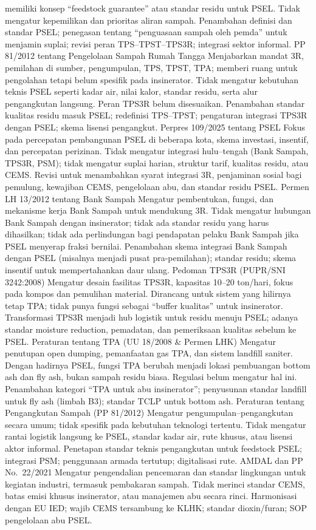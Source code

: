 \documentclass[
  letterpaper,
  DIV=11,
  numbers=noendperiod]{scrreprt}
\begin{document}
memiliki konsep ``feedstock guarantee'' atau standar residu untuk PSEL.
Tidak mengatur kepemilikan dan prioritas aliran sampah. Penambahan
definisi dan standar PSEL; penegasan tentang ``penguasaan sampah oleh
pemda'' untuk menjamin suplai; revisi peran TPS--TPST--TPS3R; integrasi
sektor informal. PP 81/2012 tentang Pengelolaan Sampah Rumah Tangga
Menjabarkan mandat 3R, pemilahan di sumber, pengumpulan, TPS, TPST, TPA;
memberi ruang untuk pengolahan tetapi belum spesifik pada insinerator.
Tidak mengatur kebutuhan teknis PSEL seperti kadar air, nilai kalor,
standar residu, serta alur pengangkutan langsung. Peran TPS3R belum
disesuaikan. Penambahan standar kualitas residu masuk PSEL; redefinisi
TPS--TPST; pengaturan integrasi TPS3R dengan PSEL; skema lisensi
pengangkut. Perpres 109/2025 tentang PSEL Fokus pada percepatan
pembangunan PSEL di beberapa kota, skema investasi, insentif, dan
percepatan perizinan. Tidak mengatur integrasi hulu--tengah (Bank
Sampah, TPS3R, PSM); tidak mengatur suplai harian, struktur tarif,
kualitas residu, atau CEMS. Revisi untuk menambahkan syarat integrasi
3R, penjaminan sosial bagi pemulung, kewajiban CEMS, pengelolaan abu,
dan standar residu PSEL. Permen LH 13/2012 tentang Bank Sampah Mengatur
pembentukan, fungsi, dan mekanisme kerja Bank Sampah untuk mendukung 3R.
Tidak mengatur hubungan Bank Sampah dengan insinerator; tidak ada
standar residu yang harus dihasilkan; tidak ada perlindungan bagi
pendapatan pelaku Bank Sampah jika PSEL menyerap fraksi bernilai.
Penambahan skema integrasi Bank Sampah dengan PSEL (misalnya menjadi
pusat pra-pemilahan); standar residu; skema insentif untuk
mempertahankan daur ulang. Pedoman TPS3R (PUPR/SNI 3242:2008) Mengatur
desain fasilitas TPS3R, kapasitas 10--20 ton/hari, fokus pada kompos dan
pemulihan material. Dirancang untuk sistem yang hilirnya tetap TPA;
tidak punya fungsi sebagai ``buffer kualitas'' untuk insinerator.
Transformasi TPS3R menjadi hub logistik untuk residu menuju PSEL; adanya
standar moisture reduction, pemadatan, dan pemeriksaan kualitas sebelum
ke PSEL. Peraturan tentang TPA (UU 18/2008 \& Permen LHK) Mengatur
penutupan open dumping, pemanfaatan gas TPA, dan sistem landfill
saniter. Dengan hadirnya PSEL, fungsi TPA berubah menjadi lokasi
pembuangan bottom ash dan fly ash, bukan sampah residu biasa. Regulasi
belum mengatur hal ini. Penambahan kategori ``TPA untuk abu
insinerator''; penyusunan standar landfill untuk fly ash (limbah B3);
standar TCLP untuk bottom ash. Peraturan tentang Pengangkutan Sampah (PP
81/2012) Mengatur pengumpulan--pengangkutan secara umum; tidak spesifik
pada kebutuhan teknologi tertentu. Tidak mengatur rantai logistik
langsung ke PSEL, standar kadar air, rute khusus, atau lisensi aktor
informal. Penetapan standar teknis pengangkutan untuk feedstock PSEL;
integrasi PSM; penggunaan armada tertutup; digitalisasi rute. AMDAL dan
PP No.~22/2021 Mengatur pengendalian pencemaran dan standar lingkungan
untuk kegiatan industri, termasuk pembakaran sampah. Tidak merinci
standar CEMS, batas emisi khusus insinerator, atau manajemen abu secara
rinci. Harmonisasi dengan EU IED; wajib CEMS tersambung ke KLHK; standar
dioxin/furan; SOP pengelolaan abu PSEL.
\end{document}
